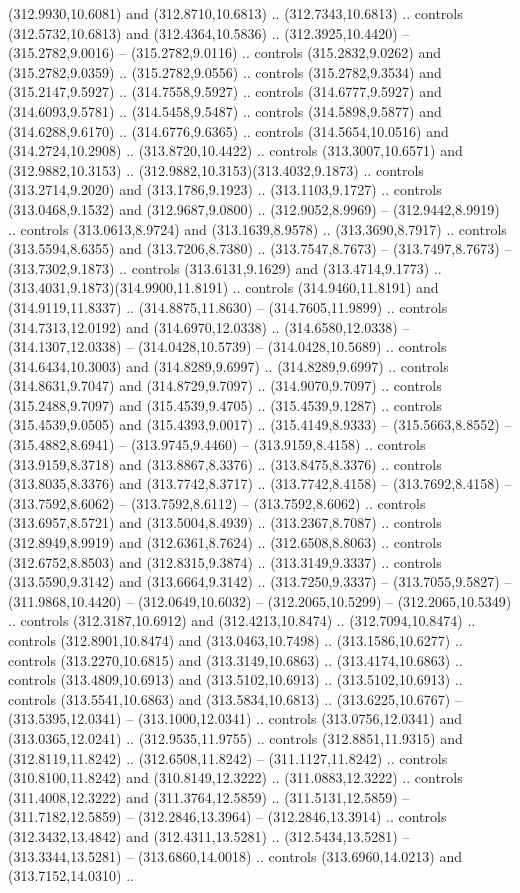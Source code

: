 (312.9930,10.6081) and (312.8710,10.6813) .. (312.7343,10.6813) .. controls (312.5732,10.6813) and (312.4364,10.5836) .. (312.3925,10.4420) -- (315.2782,9.0016) -- (315.2782,9.0116) .. controls (315.2832,9.0262) and (315.2782,9.0359) .. (315.2782,9.0556) .. controls (315.2782,9.3534) and (315.2147,9.5927) .. (314.7558,9.5927) .. controls (314.6777,9.5927) and (314.6093,9.5781) .. (314.5458,9.5487) .. controls (314.5898,9.5877) and (314.6288,9.6170) .. (314.6776,9.6365) .. controls (314.5654,10.0516) and (314.2724,10.2908) .. (313.8720,10.4422) .. controls (313.3007,10.6571) and (312.9882,10.3153) .. (312.9882,10.3153)(313.4032,9.1873) .. controls (313.2714,9.2020) and (313.1786,9.1923) .. (313.1103,9.1727) .. controls (313.0468,9.1532) and (312.9687,9.0800) .. (312.9052,8.9969) -- (312.9442,8.9919) .. controls (313.0613,8.9724) and (313.1639,8.9578) .. (313.3690,8.7917) .. controls (313.5594,8.6355) and (313.7206,8.7380) .. (313.7547,8.7673) -- (313.7497,8.7673) -- (313.7302,9.1873) .. controls (313.6131,9.1629) and (313.4714,9.1773) .. (313.4031,9.1873)(314.9900,11.8191) .. controls (314.9460,11.8191) and (314.9119,11.8337) .. (314.8875,11.8630) -- (314.7605,11.9899) .. controls (314.7313,12.0192) and (314.6970,12.0338) .. (314.6580,12.0338) -- (314.1307,12.0338) -- (314.0428,10.5739) -- (314.0428,10.5689) .. controls (314.6434,10.3003) and (314.8289,9.6997) .. (314.8289,9.6997) .. controls (314.8631,9.7047) and (314.8729,9.7097) .. (314.9070,9.7097) .. controls (315.2488,9.7097) and (315.4539,9.4705) .. (315.4539,9.1287) .. controls (315.4539,9.0505) and (315.4393,9.0017) .. (315.4149,8.9333) -- (315.5663,8.8552) -- (315.4882,8.6941) -- (313.9745,9.4460) -- (313.9159,8.4158) .. controls (313.9159,8.3718) and (313.8867,8.3376) .. (313.8475,8.3376) .. controls (313.8035,8.3376) and (313.7742,8.3717) .. (313.7742,8.4158) -- (313.7692,8.4158) -- (313.7592,8.6062) -- (313.7592,8.6112) -- (313.7592,8.6062) .. controls (313.6957,8.5721) and (313.5004,8.4939) .. (313.2367,8.7087) .. controls (312.8949,8.9919) and (312.6361,8.7624) .. (312.6508,8.8063) .. controls (312.6752,8.8503) and (312.8315,9.3874) .. (313.3149,9.3337) .. controls (313.5590,9.3142) and (313.6664,9.3142) .. (313.7250,9.3337) -- (313.7055,9.5827) -- (311.9868,10.4420) -- (312.0649,10.6032) -- (312.2065,10.5299) -- (312.2065,10.5349) .. controls (312.3187,10.6912) and (312.4213,10.8474) .. (312.7094,10.8474) .. controls (312.8901,10.8474) and (313.0463,10.7498) .. (313.1586,10.6277) .. controls (313.2270,10.6815) and (313.3149,10.6863) .. (313.4174,10.6863) .. controls (313.4809,10.6913) and (313.5102,10.6913) .. (313.5102,10.6913) .. controls (313.5541,10.6863) and (313.5834,10.6813) .. (313.6225,10.6767) -- (313.5395,12.0341) -- (313.1000,12.0341) .. controls (313.0756,12.0341) and (313.0365,12.0241) .. (312.9535,11.9755) .. controls (312.8851,11.9315) and (312.8119,11.8242) .. (312.6508,11.8242) -- (311.1127,11.8242) .. controls (310.8100,11.8242) and (310.8149,12.3222) .. (311.0883,12.3222) .. controls (311.4008,12.3222) and (311.3764,12.5859) .. (311.5131,12.5859) -- (311.7182,12.5859) -- (312.2846,13.3964) -- (312.2846,13.3914) .. controls (312.3432,13.4842) and (312.4311,13.5281) .. (312.5434,13.5281) -- (313.3344,13.5281) -- (313.6860,14.0018) .. controls (313.6960,14.0213) and (313.7152,14.0310) .. 